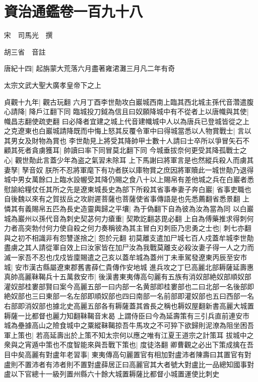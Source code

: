 \chapter{資治通鑑卷一百九十八}
宋　司馬光　撰

胡三省　音註

唐紀十四|{
	起旃蒙大荒落六月盡著雍涒灘三月凡二年有奇}


太宗文武大聖大廣孝皇帝下之上

貞觀十九年|{
	觀古玩翻}
六月丁酉李世勣攻白巖城西南上臨其西北城主孫代音濳遣腹心請降|{
	降戶江翻下同}
臨城投刀鉞為信且曰奴願降城中有不從者上以唐幟與其使|{
	幟昌志翻使疏吏翻}
曰必降者宜建之城上代音建幟城中人以為唐兵已登城皆從之上之克遼東也白巖城請降既而中悔上怒其反覆令軍中曰得城當悉以人物賞戰士|{
	言以其男女及財物為賞也}
李世勣見上將受其降帥甲士數十人請曰士卒所以爭冒矢石不顧其死者貪虜獲耳|{
	帥讀曰率下同冒莫北翻下同}
今城垂拔奈何更受其降孤戰士之心|{
	觀世勣此言蓋少年為盗之氣習未除耳}
上下馬謝曰將軍言是也然縱兵殺人而虜其妻孥|{
	孥音奴}
朕所不忍將軍麾下有功者朕以庫物賞之庶因將軍贖此一城世勣乃退得城中男女萬餘口上臨水設幄受其降仍賜之食八十以上賜帛有差他城之兵在白巖者悉慰諭給糧仗任其所之先是遼東城長史為部下所殺其省事奉妻子奔白巖|{
	省事吏職也自後魏以來有之賀拔岳之攻尉遲菩薩也菩薩使省事傳語是也先悉薦翻省悉景翻}
上憐其有義賜帛五匹為長史造靈輿歸之平壤|{
	為于偽翻下自為彼為汝為當為同}
以白巖城為巖州以孫代音為刺史契苾何力瘡重|{
	契欺訖翻苾毘必翻}
上自為傅藥推求得刺何力者高突勃付何力使自殺之何力奏稱彼為其主冒白刃刺臣乃忠勇之士也|{
	刺七亦翻}
與之初不相識非有怨讐遂捨之|{
	怨於元翻}
初莫離支遣加尸城七百人戍蓋牟城李世勣盡虜之其人請從軍自效上曰汝家皆在加尸汝為我戰莫離支必殺汝妻子得一人之力而滅一家吾不忍也戊戍皆廩賜遣之己亥以蓋牟城為蓋州丁未車駕發遼東丙辰至安市城|{
	安市漢古縣屬遼東郡舊書薛仁貴傳作安地城}
進兵攻之丁巳高麗北部耨薩延壽惠真帥高麗靺鞨兵十五萬救安市|{
	後漢書東夷傳高句麗有五族有消奴部絶奴部順奴部灌奴部桂婁部賢曰案今高麗五部一曰内部一名黄部即桂婁部也二曰北部一名後部即絶奴部也三曰東部一名左部即順奴部也四曰南部一名前部即灌奴部也五曰西部一名右部即消奴部也據北史高麗五部各有耨薩蓋其酋長之稱也耨奴屋翻新書高麗大城置耨薩一比都督也麗力知翻靺鞨音末曷}
上謂侍臣曰今為延壽策有三引兵直前連安市城為壘據高山之險食城中之粟縱靺鞨掠吾牛馬攻之不可猝下欲歸則泥潦為阻坐困吾軍上策也|{
	若高延壽出於上策不知太宗何以應之唯有江夏王道宗之計策耳}
拔城中之衆與之宵遁中策也不度智能來與吾戰下策也|{
	度徒洛翻}
卿曹觀之必出下策成擒在吾目中矣高麗有對盧年老習事|{
	東夷傳高句麗置官有相加對盧沛者陳壽曰其置官有對盧則不置沛者有沛者則不置對盧薛居正曰高麗官其大者號大對盧比一品總知國事對盧以下官總十一級列置州縣六十餘大城置耨薩比都督小城置運使比刺史}
